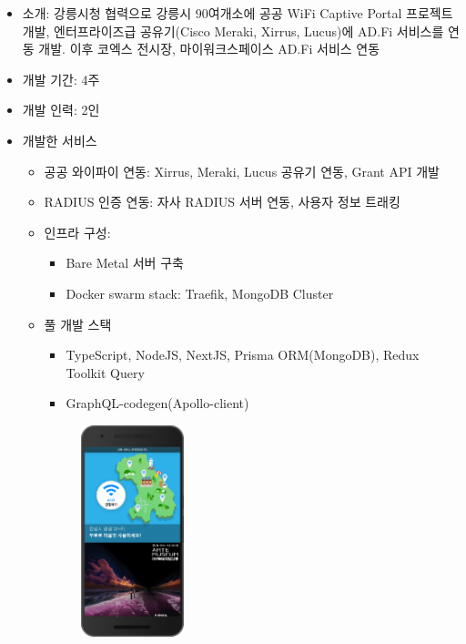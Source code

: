 \begin{itemize}[label=]
	\item 소개: 강릉시청 협력으로 강릉시 90여개소에 공공 WiFi Captive Portal 프로젝트 개발, 엔터프라이즈급 공유기(Cisco Meraki, Xirrus, Lucus)에 AD.Fi 서비스를 연동 개발. 이후 코엑스 전시장, 마이워크스페이스 AD.Fi 서비스 연동
	\item 개발 기간: 4주
	\item 개발 인력: 2인
	\item 개발한 서비스
	      \begin{itemize}[label=]
		      \item 공공 와이파이 연동: Xirrus, Meraki, Lucus 공유기 연동, Grant API 개발
		      \item RADIUS 인증 연동: 자사 RADIUS 서버 연동, 사용자 정보 트래킹
		      \item 인프라 구성:
		            \begin{itemize}
			            \item Bare Metal 서버 구축
			            \item Docker swarm stack: Traefik, MongoDB Cluster
		            \end{itemize}
		      \item 풀 개발 스택
		            \begin{itemize}
			            \item TypeScript, NodeJS, NextJS, Prisma ORM(MongoDB), Redux Toolkit Query
			            \item GraphQL-codegen(Apollo-client)
		            \end{itemize}
		            \begin{figure}[!ht]
			            \begin{fullwidth}
				            \parbox{1.6\textwidth}{
					            \centering
					            \includegraphics[width=0.3\textwidth]{images/public-ad-fi-gn-captiveportal.png}
}
\end{fullwidth}
\end{figure}
\end{itemize}
\end{itemize}

